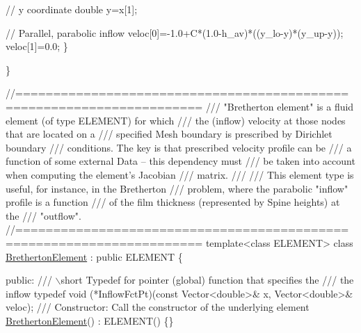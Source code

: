 \begin{DoxyCodeInclude}
  \textcolor{comment}{// y coordinate}
  \textcolor{keywordtype}{double} y=x[1];

  \textcolor{comment}{// Parallel, parabolic inflow}
  veloc[0]=-1.0+C*(1.0-h\_av)*((y\_lo-y)*(y\_up-y));
  veloc[1]=0.0;
 \}

\}




\textcolor{comment}{//======================================================================}\textcolor{comment}{}
\textcolor{comment}{/// "Bretherton element" is a fluid element (of type ELEMENT) for which}
\textcolor{comment}{/// the (inflow) velocity  at those nodes that are located on a }
\textcolor{comment}{/// specified Mesh boundary is prescribed by Dirichlet boundary }
\textcolor{comment}{/// conditions. The key is that prescribed velocity profile can be}
\textcolor{comment}{/// a function of some external Data -- this dependency must}
\textcolor{comment}{/// be taken into account when computing the element's Jacobian}
\textcolor{comment}{/// matrix.}
\textcolor{comment}{/// }
\textcolor{comment}{/// This element type is useful, for instance, in the Bretherton}
\textcolor{comment}{/// problem, where the parabolic "inflow" profile is a function }
\textcolor{comment}{/// of the film thickness (represented by Spine heights) at the}
\textcolor{comment}{/// "outflow".}
\textcolor{comment}{}\textcolor{comment}{//======================================================================}
\textcolor{keyword}{template}<\textcolor{keyword}{class} ELEMENT>
\textcolor{keyword}{class }\hyperlink{classBrethertonElement}{BrethertonElement} : \textcolor{keyword}{public} ELEMENT
\{

\textcolor{keyword}{public}:
\textcolor{comment}{}
\textcolor{comment}{ /// \(\backslash\)short Typedef for pointer (global) function that specifies the}
\textcolor{comment}{ /// the inflow}
\textcolor{comment}{} \textcolor{keyword}{typedef} void (*InflowFctPt)(\textcolor{keyword}{const} Vector<double>& x, Vector<double>& veloc);
\textcolor{comment}{}
\textcolor{comment}{ /// Constructor: Call the constructor of the underlying element}
\textcolor{comment}{} \hyperlink{classBrethertonElement}{BrethertonElement}() : ELEMENT() \{\}


\end{DoxyCodeInclude}
